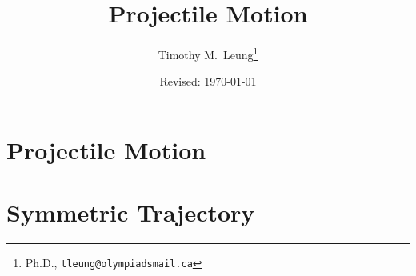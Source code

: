 \documentclass[11pt]{article}
\title{Projectile Motion}
\author{Timothy M.\ Leung\thanks{Ph.D., \texttt{tleung@olympiadsmail.ca}}}
\affil{Olympiads School\\Toronto, Ontario, Canada}
\date{Revised: \today}
\begin{document}
\maketitle


\section{Projectile Motion}

%    
%    

%
\section{Symmetric Trajectory}
\end{document}
